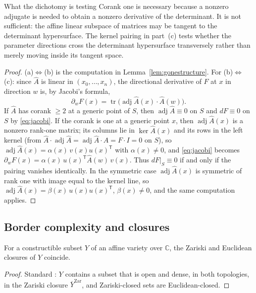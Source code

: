 \documentclass[acmsmall,screen,nonacm]{acmart}
\theoremstyle{definition}
\theoremstyle{remark}
\DeclareMathOperator{\adj}{adj}
\DeclareMathOperator{\tr}{tr}
\newcommand{\CC}{\mathbb{C}}
\begin{document}
\begin{detailbox}{What the dichotomy is testing}
Corank one is necessary because a nonzero adjugate is needed to obtain a
nonzero derivative of the determinant.  It is not sufficient: the affine
linear subspace of matrices may be tangent to the determinant hypersurface.
The kernel pairing in part~(c) tests whether the parameter directions cross
the determinant hypersurface transversely rather than merely moving inside
its tangent space.
\end{detailbox}

\begin{proof}
(a)$\Leftrightarrow$(b) is the computation in
Lemma~\ref{lem:gonestructure}.  For (b)$\Leftrightarrow$(c): since
$\widehat A$ is linear in $(x_0,\dots,x_n)$, the directional
derivative of $F$ at $x$ in direction $w$ is, by Jacobi's formula,
\begin{equation}\label{eq:jacobi}
  \partial_wF(x)
  =\tr\!\big(\adj\widehat A(x)\cdot\widehat A(w)\big).
\end{equation}
If $\widehat A$ has corank $\ge2$ at a generic point of $S$, then
$\adj\widehat A\equiv0$ on $S$ and $dF\equiv0$ on $S$ by
\eqref{eq:jacobi}.  If the corank is one at a generic point $x$, then
$\adj\widehat A(x)$ is a nonzero rank-one matrix; its columns lie in
$\ker\widehat A(x)$ and its rows in the left kernel (from
$\widehat A\cdot\adj\widehat A=\adj\widehat A\cdot\widehat A=F\cdot I
=0$ on $S$), so $\adj\widehat A(x)=\alpha(x)\,v(x)u(x)^{\mathsf T}$
with $\alpha(x)\ne0$, and \eqref{eq:jacobi} becomes
$\partial_wF(x)=\alpha(x)\,u(x)^{\mathsf T}\widehat A(w)\,v(x)$.
Thus $dF|_S\equiv0$ if and only if the pairing vanishes identically.
In the symmetric case $\adj\widehat A(x)$ is symmetric of rank one
with image equal to the kernel line, so
$\adj\widehat A(x)=\beta(x)\,u(x)u(x)^{\mathsf T}$, $\beta(x)\ne0$,
and the same computation applies.
\end{proof}

\subsection{Border complexity and closures}

\begin{lemma}\label{lem:closure}
For a constructible subset $Y$ of an affine variety over $\CC$, the
Zariski and Euclidean closures of $Y$ coincide.
\end{lemma}

\begin{proof}
Standard \cite[I.10]{Mumford99}: $Y$ contains a subset that is open
and dense, in both topologies, in the Zariski closure
$\overline{Y}^{\mathrm{Zar}}$, and Zariski-closed sets are
Euclidean-closed.
\end{proof}
\end{document}
